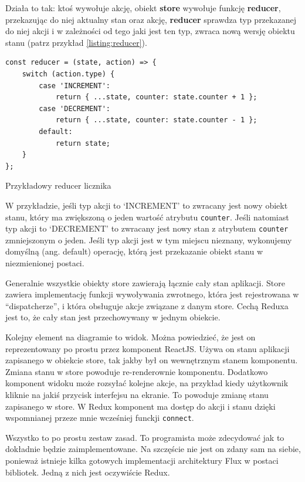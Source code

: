 Działa to tak: ktoś wywołuje akcję, obiekt \textbf{store} wywołuje funkcję \textbf{reducer},
przekazując do niej aktualny stan oraz akcję, \textbf{reducer}
sprawdza typ przekazanej do niej akcji i w zależności od tego jaki jest ten typ,
zwraca nową wersję obiektu stanu (patrz przykład \ref{listing:reducer}).

\begin{listing}
\begin{verbatim}
const reducer = (state, action) => {
    switch (action.type) {
        case 'INCREMENT':
            return { ...state, counter: state.counter + 1 };
        case 'DECREMENT':
            return { ...state, counter: state.counter - 1 };
        default:
            return state;
    }
};
\end{verbatim}
\caption{Przykładowy reducer licznika} \label{listing:reducer}
\end{listing}

W przykładzie, jeśli typ akcji to `INCREMENT' to zwracany jest nowy obiekt stanu,
który ma zwiększoną o jeden wartość atrybutu \texttt{counter}.
Jeśli natomiast typ akcji to `DECREMENT' to zwracany jest nowy stan z atrybutem
\texttt{counter} zmniejszonym o jeden.
Jeśli typ akcji jest w tym miejscu nieznany, wykonujemy domyślną (ang. default) operację, którą jest
przekazanie obiekt stanu w niezmienionej postaci.

Generalnie wszystkie obiekty store zawierają łącznie cały stan aplikacji.
Store zawiera implementację funkcji wywoływania zwrotnego,
która jest rejestrowana w ``dispatcherze'', i która obsługuje akcje związane z danym store.
Cechą Reduxa jest to, że cały stan jest przechowywany w jednym obiekcie.

Kolejny element na diagramie to widok.
Można powiedzieć, że jest on reprezentowany po prostu przez komponent ReactJS.
Używa on stanu aplikacji zapisanego w obiekcie store, tak jakby był on wewnętrznym stanem komponentu.
Zmiana stanu w store powoduje re-renderownie komponentu.
Dodatkowo komponent widoku może rozsyłać kolejne akcje, na przykład kiedy użytkownik
kliknie na jakiś przycisk interfejsu na ekranie.
To powoduje zmianę stanu zapisanego w store.
W Redux komponent ma dostęp do akcji i stanu dzięki wspomnianej przeze mnie wcześniej funckji \texttt{connect}.

Wszystko to po prostu zestaw zasad.
To programista może zdecydować jak to dokładnie będzie zaimplementowane.
Na szczęście nie jest on zdany sam na siebie, ponieważ istnieje kilka gotowych
implementacji architektury Flux w postaci bibliotek.
Jedną z nich jest oczywiście Redux.
\cite{www_nafrontendzie}

